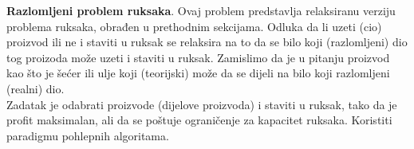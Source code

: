 \begin{example} \textbf{Razlomljeni problem ruksaka}. 
  Ovaj problem predstavlja relaksiranu verziju problema ruksaka, obrađen u prethodnim sekcijama. Odluka da li uzeti (cio)  proizvod ili ne i staviti u ruksak se relaksira na to da se bilo koji (razlomljeni) dio tog proizoda može uzeti i staviti u ruksak. Zamislimo da je u pitanju proizvod kao što je šećer ili ulje koji (teorijski) može da se dijeli na bilo koji razlomljeni  (realni) dio.  \\
  
   Zadatak je odabrati proizvode (dijelove proizvoda) i staviti u ruksak, tako da je profit maksimalan, ali da se poštuje ograničenje za kapacitet  ruksaka. Koristiti paradigmu pohlepnih algoritama. 
\end{example}

